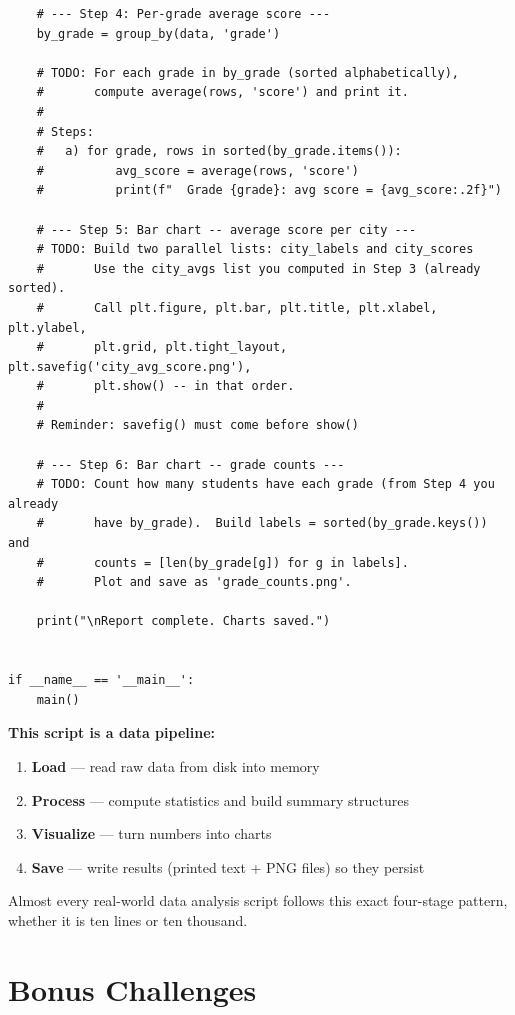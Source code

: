\documentclass{cslab}
\begin{document}
\begin{lstlisting}
    # --- Step 4: Per-grade average score ---
    by_grade = group_by(data, 'grade')

    # TODO: For each grade in by_grade (sorted alphabetically),
    #       compute average(rows, 'score') and print it.
    #
    # Steps:
    #   a) for grade, rows in sorted(by_grade.items()):
    #          avg_score = average(rows, 'score')
    #          print(f"  Grade {grade}: avg score = {avg_score:.2f}")

    # --- Step 5: Bar chart -- average score per city ---
    # TODO: Build two parallel lists: city_labels and city_scores
    #       Use the city_avgs list you computed in Step 3 (already sorted).
    #       Call plt.figure, plt.bar, plt.title, plt.xlabel, plt.ylabel,
    #       plt.grid, plt.tight_layout, plt.savefig('city_avg_score.png'),
    #       plt.show() -- in that order.
    #
    # Reminder: savefig() must come before show()

    # --- Step 6: Bar chart -- grade counts ---
    # TODO: Count how many students have each grade (from Step 4 you already
    #       have by_grade).  Build labels = sorted(by_grade.keys()) and
    #       counts = [len(by_grade[g]) for g in labels].
    #       Plot and save as 'grade_counts.png'.

    print("\nReport complete. Charts saved.")


if __name__ == '__main__':
    main()
\end{lstlisting}

\begin{note}
\textbf{This script is a data pipeline:}
\begin{enumerate}
    \item \textbf{Load} --- read raw data from disk into memory
    \item \textbf{Process} --- compute statistics and build summary structures
    \item \textbf{Visualize} --- turn numbers into charts
    \item \textbf{Save} --- write results (printed text + PNG files) so they persist
\end{enumerate}
Almost every real-world data analysis script follows this exact four-stage pattern, whether it is ten lines or ten thousand.
\end{note}

\section{Bonus Challenges}
\end{document}
